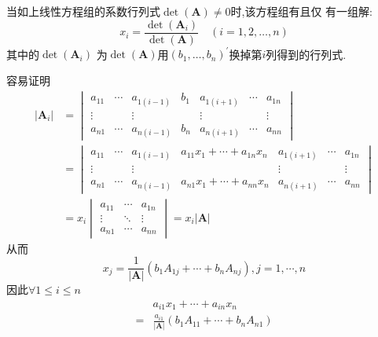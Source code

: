 \begin{formal}
\begin{theorem}[Cramer法则]\label{thm:Cramer法则}
当如上线性方程组的系数行列式$ \det\left(\bm{A}\right) \neq 0$时,该方程组有且仅
有一组解:
\[
x_i = \frac{ \det\left(\bm{A}_i\right)}
{ \det\left(\bm{A}\right)}\quad\left(
    i = 1,2,\ldots,n
\right)
\]
其中的$ \det\left(\bm{A}_i\right)$
为$ \det\left(\bm{A}\right)$用$\left(
    b_1,\ldots,b_n
\right)^{\prime}$换掉第$i$列得到的行列式.
\end{theorem}

\begin{Proof}
容易证明
\begin{align*}
\left|\bm{A}_i\right|
& =
\begin{vmatrix}
    a_{11} & \cdots & a_{1\left(i - 1\right)} & b_1 & a_{1\left(i + 1\right)} & \cdots & a_{1n} \\
    \vdots &        & \vdots                  &     & \vdots                  &        & \vdots \\
    a_{n1} & \cdots & a_{n\left(i - 1\right)} & b_n & a_{n\left(i + 1\right)} & \cdots & a_{nn}
\end{vmatrix}\\
& =\begin{vmatrix}
    a_{11} & \cdots & a_{1\left(i - 1\right)} & a_{11}x_1 + \cdots +a_{1n}x_n & a_{1\left(i + 1\right)} & \cdots & a_{1n} \\
    \vdots &        & \vdots                  &                               & \vdots                  &        & \vdots \\
    a_{n1} & \cdots & a_{n\left(i - 1\right)} & a_{n1}x_1 + \cdots +a_{nn}x_n & a_{n\left(i + 1\right)} & \cdots & a_{nn}
\end{vmatrix}
\\
& = x_i 
\begin{vmatrix}
    a_{11} & \cdots & a_{1n} \\
    \vdots & \ddots & \vdots \\
    a_{n1} & \cdots & a_{nn}
\end{vmatrix}
= x_i \left|\bm{A}\right|
\end{align*}
从而
\[
x_j = \frac{1}{\left|\bm{A}\right|}
\left(
    b_1A_{1j}+\cdots
    +b_nA_{nj}
\right),j = 1,\cdots,n
\]
因此$\forall 1\leqslant i
\leqslant n$
\begin{align*}
    & a_{i1}x_1+\cdots+a_{in}x_n\\
  = & \frac{a_{i1}}{\left|\bm{A}\right|}
  \left(b_1A_{11}+\cdots
  +b_nA_{n1}\right)\\

\end{align*}
\end{Proof}
\end{formal}

